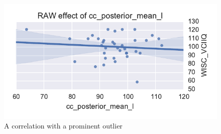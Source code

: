 \documentclass[twocolumn]{svjour3}
\begin{document}
\begin{figure}
\begin{center}
\includegraphics[width=\linewidth]{initial_corr}
\end{center}
 \caption{\label{fig_lm}A correlation with a prominent outlier}
\end{figure}
\end{document}
